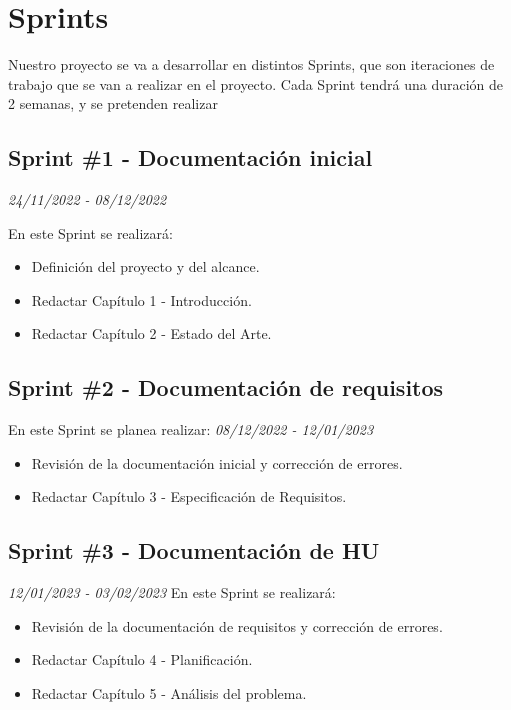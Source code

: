 \begin{itemize}
\end{itemize}

\section{Sprints}
Nuestro proyecto se va a desarrollar en distintos Sprints, que son iteraciones de trabajo que se van a realizar en el proyecto.
Cada Sprint tendrá una duración de 2 semanas, y se pretenden realizar
\subsection{Sprint \#1 - Documentación inicial}
\textit{24/11/2022   -   08/12/2022}

En este Sprint se realizará:
\begin{itemize}

    \item Definición del proyecto y del alcance.
    \item Redactar Capítulo 1 - Introducción.
    \item Redactar Capítulo 2 - Estado del Arte.
\end{itemize}
\subsection{Sprint \#2 - Documentación de requisitos}
En este Sprint se planea realizar:
\textit{08/12/2022   -   12/01/2023}
\begin{itemize}
    \item Revisión de la documentación inicial y corrección de errores.
    \item Redactar Capítulo 3 - Especificación de Requisitos.
\end{itemize}

\subsection{Sprint \#3 - Documentación de HU}
\textit{12/01/2023   -   03/02/2023}
En este Sprint se realizará:
\begin{itemize}
    \item Revisión de la documentación de requisitos y corrección de errores.
    \item Redactar Capítulo 4 - Planificación.
    \item Redactar Capítulo 5 - Análisis del problema.
\end{itemize}
